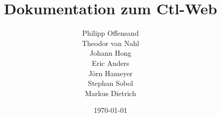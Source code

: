 \documentclass[12pt,a4paper]{scrartcl}
\begin{document}
\title{Dokumentation zum Ctl-Web}
\begin{center}
\author{
Philipp Offensand\\
Theodor van Nahl\\
Johann Hong\\
Eric Anders\\
Jörn Hameyer\\
Stephan Sobol\\
Markus Dietrich\\
}
\end{center}
\date{\today}



\maketitle
\tableofcontents






\end{document}

